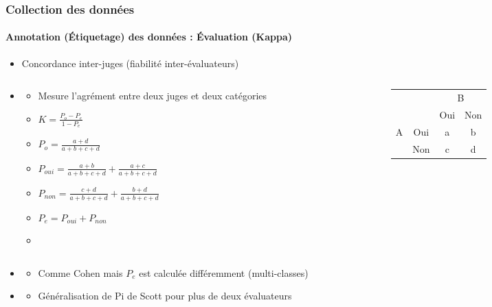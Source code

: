 \documentclass[xcolor=table]{beamer}
\begin{document}
\begin{frame}
	\frametitle{Collection des données}
	\framesubtitle{Annotation (Étiquetage) des données : Évaluation (Kappa)}
	
	\begin{itemize}
		\item Concordance inter-juges (fiabilité inter-évaluateurs) 
	\end{itemize}

\begin{columns}
\begin{column}{0.6\textwidth}
	\begin{itemize}
		\item {}
		\begin{itemize}
			\item Mesure l'agrément entre deux juges et deux catégories
			\item $K = \frac{P_o - P_e}{1 - P_e}$
			\item $P_o = \frac{a + d}{a+b+c+d}$
			\item $P_{oui} = \frac{a+b}{a+b+c+d} + \frac{a+c}{a+b+c+d}$
			\item $P_{non} = \frac{c+d}{a+b+c+d} + \frac{b+d}{a+b+c+d}$
			\item $P_e = P_{oui} + P_{non}$
			\item {}
		\end{itemize}
	\end{itemize}
\end{column}
\begin{column}{0.4\textwidth}
	\begin{tabular}{|c|c|c|c|}
		\cline{3-4}
		\multicolumn{2}{c|}{}& \multicolumn{2}{c|}{B} \\
		\cline{3-4}
		\multicolumn{2}{c|}{}& Oui & Non \\
		\hline
		\multirow{2}{*}{A} & Oui & a & b \\
		\cline{2-4}
		& Non & c & d \\
		\hline
	\end{tabular}
\end{column}
\end{columns}

\begin{itemize}
	\item {}
	\begin{itemize}
		\item Comme Cohen mais $P_e$ est calculée différemment (multi-classes)
	\end{itemize}
	\item {}
	\begin{itemize}
		\item Généralisation de Pi de Scott pour plus de deux évaluateurs
	\end{itemize}
\end{itemize}

\end{frame}
\end{document}
